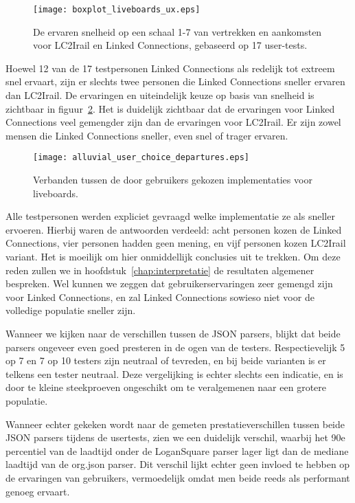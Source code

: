 \begin{figure}[h]
	\centering
	\texttt{[image: boxplot\_liveboards\_ux.eps]}
	\caption[Ervaren snelheid van liveboards]{De ervaren snelheid op een schaal 1-7 van vertrekken en aankomsten voor LC2Irail en Linked Connections, gebaseerd op 17 user-tests.}
	\label{fig:liveboardsUx}
\end{figure}

Hoewel 12 van de 17 testpersonen Linked Connections als redelijk tot extreem snel ervaart, zijn er slechts twee personen die Linked Connections sneller ervaren dan LC2Irail. De ervaringen en uiteindelijk keuze op basis van snelheid is zichtbaar in figuur~\ref{fig:alluvialUserChoicesLiveboards}. Het is duidelijk zichtbaar dat de ervaringen voor Linked Connections veel gemengder zijn dan de ervaringen voor LC2Irail. Er zijn zowel mensen die Linked Connections sneller, even snel of trager ervaren. 

\begin{figure}[ht]
	\centering
	\texttt{[image: alluvial\_user\_choice\_departures.eps]}
	\caption[Door gebruikers gekozen implementatie voor liveboards]{Verbanden tussen de door gebruikers gekozen implementaties voor liveboards. }
	\label{fig:alluvialUserChoicesLiveboards}
\end{figure}

Alle testpersonen werden expliciet gevraagd welke implementatie ze als sneller ervoeren. Hierbij waren de antwoorden verdeeld: acht personen kozen de Linked Connections, vier personen hadden geen mening, en vijf personen kozen LC2Irail variant. Het is moeilijk om hier onmiddellijk conclusies uit te trekken. Om deze reden zullen we in hoofdstuk~\ref{chap:interpretatie} de resultaten algemener bespreken. Wel kunnen we zeggen dat gebruikerservaringen zeer gemengd zijn voor Linked Connections, en zal Linked Connections sowieso niet voor de volledige populatie sneller zijn.

Wanneer we kijken naar de verschillen tussen de JSON parsers, blijkt dat beide parsers ongeveer even goed presteren in de ogen van de testers. Respectievelijk 5 op 7 en 7 op 10 testers zijn neutraal of tevreden, en bij beide varianten is er telkens een tester neutraal. Deze vergelijking is echter slechts een indicatie, en is door te kleine steekproeven ongeschikt om te veralgemenen naar een grotere populatie.

Wanneer echter gekeken wordt naar de gemeten prestatieverschillen tussen beide JSON parsers tijdens de usertests, zien we een duidelijk verschil, waarbij het 90e percentiel van de laadtijd onder de LoganSquare parser lager ligt dan de mediane laadtijd van de org.json parser. Dit verschil lijkt echter geen invloed te hebben op de ervaringen van gebruikers, vermoedelijk omdat men beide reeds als performant genoeg ervaart. %

